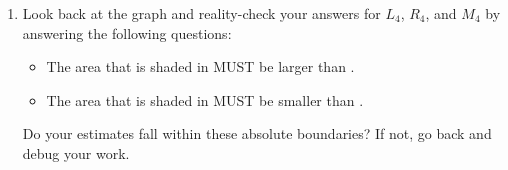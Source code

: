 \documentclass[11pt]{article}
\newcommand{\cuthere}{%
\noindent
\raisebox{-2.8pt}[0pt][0.75\baselineskip]{\small\ding{34}}
\unskip{\tiny\dotfill}
}
\def\blank{\underline{\hspace{1in}}}
\begin{document}
\begin{enumerate}
	\vspace{0.5in}
	
	\item Look back at the graph and reality-check your answers for $L_4$, $R_4$, and $M_4$ by answering the following questions: 
	\begin{itemize}
		\item The area that is shaded in MUST be larger than \blank. 
		\item The area that is shaded in MUST be smaller than \blank. 
	\end{itemize}
Do your estimates fall within these absolute boundaries? If not, go back and debug your work. 
	
\end{enumerate}


% 
% 
% 
\end{document}
